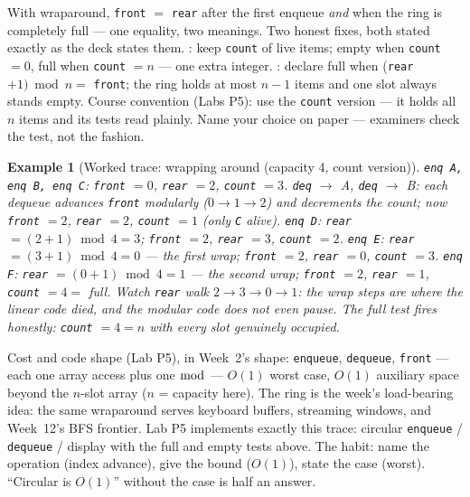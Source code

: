 \documentclass[11pt]{article}
\newtheorem{example}{Example}[section]
\begin{document}
With wraparound, \texttt{front} $=$ \texttt{rear} after the first enqueue \emph{and} when the ring is completely full --- one equality, two meanings. Two honest fixes, both stated exactly as the deck states them. : keep \texttt{count} of live items; empty when \texttt{count} $= 0$, full when \texttt{count} $= n$ --- one extra integer. : declare full when (\texttt{rear} $+ 1) \bmod n =$ \texttt{front}; the ring holds at most $n - 1$ items and one slot always stands empty. Course convention (Labs P5): use the \texttt{count} version --- it holds all $n$ items and its tests read plainly. Name your choice on paper --- examiners check the test, not the fashion.

\begin{example}[Worked trace: wrapping around (capacity 4, count version)]
\texttt{enq A, enq B, enq C}: \texttt{front} $= 0$, \texttt{rear} $= 2$, \texttt{count} $= 3$. \texttt{deq} $\to$ A, \texttt{deq} $\to$ B: each dequeue advances \texttt{front} modularly ($0 \to 1 \to 2$) and decrements the count; now \texttt{front} $= 2$, \texttt{rear} $= 2$, \texttt{count} $= 1$ (only \texttt{C} alive). \texttt{enq D}: \texttt{rear} $= (2+1) \bmod 4 = 3$; \texttt{front} $= 2$, \texttt{rear} $= 3$, \texttt{count} $= 2$. \texttt{enq E}: \texttt{rear} $= (3+1) \bmod 4 = 0$ --- the first wrap; \texttt{front} $= 2$, \texttt{rear} $= 0$, \texttt{count} $= 3$. \texttt{enq F}: \texttt{rear} $= (0+1) \bmod 4 = 1$ --- the second wrap; \texttt{front} $= 2$, \texttt{rear} $= 1$, \texttt{count} $= 4 =$ full. Watch \texttt{rear} walk $2 \to 3 \to 0 \to 1$: the wrap steps are where the linear code died, and the modular code does not even pause. The full test fires honestly: \texttt{count} $= 4 = n$ with every slot genuinely occupied.
\end{example}

Cost and code shape (Lab P5), in Week~2's shape: \texttt{enqueue}, \texttt{dequeue}, \texttt{front} --- each one array access plus one $\bmod$ --- $O(1)$ worst case, $O(1)$ auxiliary space beyond the $n$-slot array ($n$ = capacity here). The ring is the week's load-bearing idea: the same wraparound serves keyboard buffers, streaming windows, and Week~12's BFS frontier. Lab P5 implements exactly this trace: circular \texttt{enqueue} / \texttt{dequeue} / display with the full and empty tests above. The habit: name the operation (index advance), give the bound ($O(1)$), state the case (worst). ``Circular is $O(1)$'' without the case is half an answer.
\end{document}
